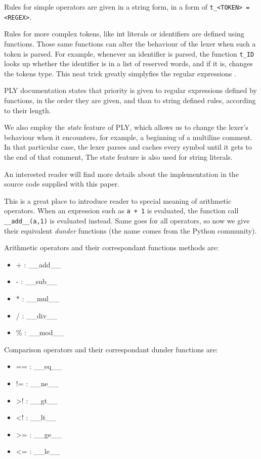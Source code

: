 \documentclass[times, utf8, diplomski]{fer}
\theoremstyle{definition}
\begin{document}
Rules for simple operators are given in a string form, in a form of 
\texttt{t\_<TOKEN> = <REGEX>}.

Rules for more complex tokens, like int literals or identifiers are defined
using functions. Those same functions can alter the behaviour of the
lexer when such a token is parsed. For example, whenever an identifier is parsed,
the function \texttt{t\_ID} looks up whether the identifier is in a list of reserved
words, and if it is, changes the tokens type. This neat trick greatly simplyfies the
regular expressions \citep{c_ply_docs_beazley}.

PLY documentation states that priority is given to regular expressions defined by functions, in the order they are given, and than to string defined rules, according to their length. 

We also employ the \textit{state} feature of PLY, 
which allows us to change the lexer's behaviour
when it encounters, for example, a beginning of a multiline comment. 
In that particular case, the lexer parses and caches every 
symbol until it gets to the end of that comment, 
The state feature is also used for string literals.

An interested reader will find more details about the implementation in
the source code supplied with this paper.

This is a great place to introduce reader to special meaning of arithmetic operators.
When an expression such as \texttt{a + 1} is evaluated, 
the function call \texttt{\_\_add\_\_(a,1)} is evaluated instead.
Same goes for all operators, so now we give their equivalent \textit{dunder} functions 
(the name comes from the Python community). 

Arithmetic operators and their correspondant functions methods are:

\begin{itemize}
    \item + : \_\_add\_\_
    \item - : \_\_sub\_\_
    \item * : \_\_mul\_\_
    \item / : \_\_div\_\_
    \item \% : \_\_mod\_\_
\end{itemize}

Comparison operators and their correspondant dunder functions are:

\begin{itemize}
    \item == : \_\_eq\_\_
    \item != : \_\_ne\_\_
    \item >! : \_\_gt\_\_
    \item <! : \_\_lt\_\_
    \item >= : \_\_ge\_\_
    \item <= : \_\_le\_\_
\end{itemize}
\end{document}
